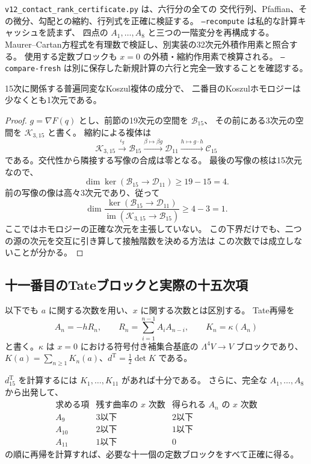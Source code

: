\texttt{v12\_contact\_rank\_certificate.py} は、六行分の全ての
交代行列、Pfaffian、その微分、勾配との縮約、行列式を正確に検証する。
\texttt{--recompute} は私的な計算キャッシュを読まず、
四点の $A_1,\ldots,A_8$ と三つの一階変分を再構成する。
Maurer--Cartan方程式を有理数で検証し、別実装の32次元外積作用素と照合する。
使用する定数ブロックも $x=0$ の外積・縮約作用素で検算される。
\texttt{--compare-fresh} は別に保存した新規計算の六行と完全一致することを確認する。

\begin{corollary}[Pfaffian代入後のKoszul完全性は破れる]
\label{cor:v12-koszul-homology}
15次に関係する普遍同変なKoszul複体の成分で、
二番目のKoszulホモロジーは少なくとも1次元である。
\end{corollary}
\begin{proof}
$g=\nabla F(q)$ とし、前節の19次元の空間を $\mathcal B_{15}$、
その前にある3次元の空間を $\mathcal K_{3,15}$ と書く。
縮約による複体は
\[
 \mathcal K_{3,15}\xrightarrow{\iota_g}
 \mathcal B_{15}\xrightarrow{\beta\mapsto\beta g}
 \mathcal D_{11}\xrightarrow{h\mapsto g\cdot h}\mathcal C_{15}
\]
である。交代性から隣接する写像の合成は零となる。
最後の写像の核は15次元なので、
\[
 \dim\ker(\mathcal B_{15}\to\mathcal D_{11})\ge19-15=4.
\]
前の写像の像は高々3次元であり、従って
\[
 \dim\frac{\ker(\mathcal B_{15}\to\mathcal D_{11})}
 {\operatorname{im}(\mathcal K_{3,15}\to\mathcal B_{15})}
 \ge4-3=1.
\]
ここではホモロジーの正確な次元を主張していない。
この下界だけでも、二つの源の次元を交互に引き算して接触階数を決める方法は
この次数では成立しないことが分かる。
\end{proof}

\subsection{十一番目のTateブロックと実際の十五次項}

以下でも $a$ に関する次数を用い、$x$ に関する次数とは区別する。
Tate再帰を
\[
 A_n=-hR_n,\qquad R_n=\sum_{i=1}^{n-1}A_iA_{n-i},
 \qquad K_n=\kappa(A_n)
\]
と書く。$\kappa$ は $x=0$ における符号付き補集合基底の
$\Lambda^4V\to V$ ブロックであり、
$K(a)=\sum_{n\ge1}K_n(a)$、$d^{\mathrm T}=\tfrac12\det K$ である。

\begin{lemma}[十五次係数のための正確な切断]
\label{lem:v12-exact-eleventh-truncation}
$d^{\mathrm T}_{15}$ を計算するには $K_1,\ldots,K_{11}$ があれば十分である。
さらに、完全な $A_1,\ldots,A_8$ から出発して、
\[
\begin{array}{c|c|c}
 \text{求める項}&\text{残す曲率の $x$ 次数}&
                    \text{得られる $A_n$ の $x$ 次数}\\ \hline
 A_9&3\text{以下}&2\text{以下}\\
 A_{10}&2\text{以下}&1\text{以下}\\
 A_{11}&1\text{以下}&0
\end{array}
\]
の順に再帰を計算すれば、必要な十一個の定数ブロックをすべて正確に得る。
\end{lemma}

